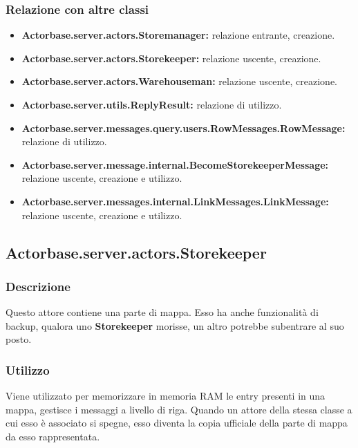 \documentclass[a4paper]{article}
\begin{document}
			\subsubsection{Relazione con altre classi}
				\begin{itemize}
					\item \textbf{Actorbase.server.actors.Storemanager:} relazione entrante, creazione.
					\item \textbf{Actorbase.server.actors.Storekeeper:} relazione uscente, creazione.
					\item \textbf{Actorbase.server.actors.Warehouseman:} relazione uscente, creazione.
					\item \textbf{Actorbase.server.utils.ReplyResult:} relazione di utilizzo.
					\item \textbf{Actorbase.server.messages.query.users.RowMessages.RowMessage:} relazione di utilizzo.
					\item \textbf{Actorbase.server.message.internal.BecomeStorekeeperMessage:} relazione uscente, creazione e utilizzo.
					\item \textbf{Actorbase.server.messages.internal.LinkMessages.LinkMessage:} relazione uscente, creazione e utilizzo.
				\end{itemize}
				
		\subsection{Actorbase.server.actors.Storekeeper}
			\subsubsection{Descrizione}
				Questo attore contiene una parte di mappa. Esso ha anche funzionalità di backup, qualora uno \textbf{Storekeeper} morisse, 
				un altro potrebbe subentrare al suo posto.
				
			\subsubsection{Utilizzo}
				Viene utilizzato per memorizzare in memoria RAM le entry presenti in una mappa, gestisce i messaggi a livello di riga.
				Quando un attore della stessa classe a cui esso è associato si spegne, esso diventa la copia ufficiale della parte di mappa 
				da esso rappresentata.
				
\end{document}
